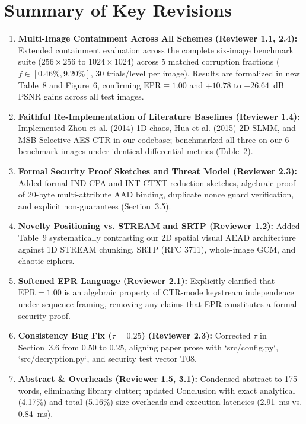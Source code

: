 \documentclass[11pt,a4paper]{article}
\begin{document}
\section*{Summary of Key Revisions}
\begin{enumerate}[leftmargin=*]
    \item \textbf{Multi-Image Containment Across All Schemes (Reviewer 1.1, 2.4):} Extended containment evaluation across the complete six-image benchmark suite ($256\times 256$ to $1024\times 1024$) across 5 matched corruption fractions ($f \in [0.46\%, 9.20\%]$, 30 trials/level per image). Results are formalized in new Table~8 and Figure~6, confirming $\text{EPR} \equiv 1.00$ and $+10.78$ to $+26.64$~dB PSNR gains across all test images.
    \item \textbf{Faithful Re-Implementation of Literature Baselines (Reviewer 1.4):} Implemented Zhou et al. (2014) 1D chaos, Hua et al. (2015) 2D-SLMM, and MSB Selective AES-CTR in our codebase; benchmarked all three on our 6 benchmark images under identical differential metrics (Table~2).
    \item \textbf{Formal Security Proof Sketches and Threat Model (Reviewer 2.3):} Added formal IND-CPA and INT-CTXT reduction sketches, algebraic proof of 20-byte multi-attribute AAD binding, duplicate nonce guard verification, and explicit non-guarantees (Section~3.5).
    \item \textbf{Novelty Positioning vs. STREAM and SRTP (Reviewer 1.2):} Added Table~9 systematically contrasting our 2D spatial visual AEAD architecture against 1D STREAM chunking, SRTP (RFC 3711), whole-image GCM, and chaotic ciphers.
    \item \textbf{Softened EPR Language (Reviewer 2.1):} Explicitly clarified that $\text{EPR} = 1.00$ is an algebraic property of CTR-mode keystream independence under sequence framing, removing any claims that EPR constitutes a formal security proof.
    \item \textbf{Consistency Bug Fix ($\tau = 0.25$) (Reviewer 2.3):} Corrected $\tau$ in Section~3.6 from $0.50$ to $0.25$, aligning paper prose with `src/config.py`, `src/decryption.py`, and security test vector T08.
    \item \textbf{Abstract & Overheads (Reviewer 1.5, 3.1):} Condensed abstract to 175 words, eliminating library clutter; updated Conclusion with exact analytical (4.17\%) and total (5.16\%) size overheads and execution latencies (2.91~ms vs. 0.84~ms).
\end{enumerate}
\end{document}

